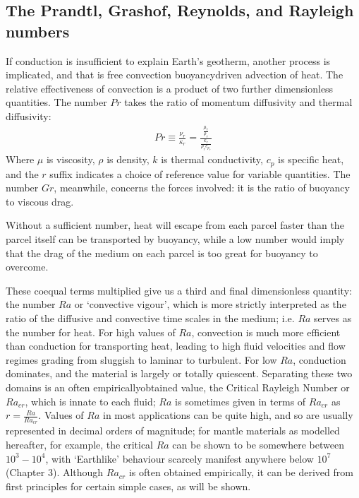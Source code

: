 \documentclass[letterpaper,10pt,english]{jupyterBook}
\begin{document}
\subsection{The Prandtl, Grashof, Reynolds, and Rayleigh numbers}
\label{\detokenize{content/chapter_02_methods/section1:the-prandtl-grashof-reynolds-and-rayleigh-numbers}}
\sphinxAtStartPar
If conduction is insufficient to explain Earth’s geotherm, another process is implicated, and that is free convection \sphinxhyphen{} buoyancy\sphinxhyphen{}driven advection of heat. The relative effectiveness of convection is a product of two further dimensionless quantities. The  number \(Pr\) takes the ratio of momentum diffusivity and thermal diffusivity:
\begin{equation*}
\begin{split} Pr \equiv \frac{\nu_r}{\kappa_r} = \frac{\frac{\mu_r}{\rho_r}}{\frac{k_r}{\rho_r c_{p_r}}} \end{split}
\end{equation*}
\sphinxAtStartPar
Where \(\mu\) is viscosity, \(\rho\) is density, \(k\) is thermal conductivity, \(c_p\) is specific heat, and the \(r\) suffix indicates a choice of reference value for variable quantities. The  number \(Gr\), meanwhile, concerns the forces involved: it is the ratio of buoyancy to viscous drag.

\sphinxAtStartPar
Without a sufficient  number, heat will escape from each parcel faster than the parcel itself can be transported by buoyancy, while a low  number would imply that the drag of the medium on each parcel is too great for buoyancy to overcome.

\sphinxAtStartPar
These co\sphinxhyphen{}equal terms multiplied give us a third and final dimensionless quantity: the  number \(Ra\) or ‘convective vigour’, which is more strictly interpreted as the ratio of the diffusive and convective time scales in the medium; i.e. \(Ra\) serves as the  number for heat. For high values of \(Ra\), convection is much more efficient than conduction for transporting heat, leading to high fluid velocities and flow regimes grading from sluggish to laminar to turbulent. For low \(Ra\), conduction dominates, and the material is largely or totally quiescent. Separating these two domains is an often empirically\sphinxhyphen{}obtained value, the Critical Rayleigh Number or \(Ra_{cr}\), which is innate to each fluid; \(Ra\) is sometimes given in terms of \(Ra_{cr}\) as \(r = \frac{Ra}{Ra_{cr}}\). Values of \(Ra\) in most applications can be quite high, and so are usually represented in decimal orders of magnitude; for mantle materials as modelled hereafter, for example, the critical \(Ra\) can be shown to be somewhere between \(10^3-10^4\), with ‘Earthlike’ behaviour scarcely manifest anywhere below \(10^7\) (Chapter 3). Although \(Ra_{cr}\) is often obtained empirically, it can be derived from first principles for certain simple cases, as will be shown.
\end{document}
